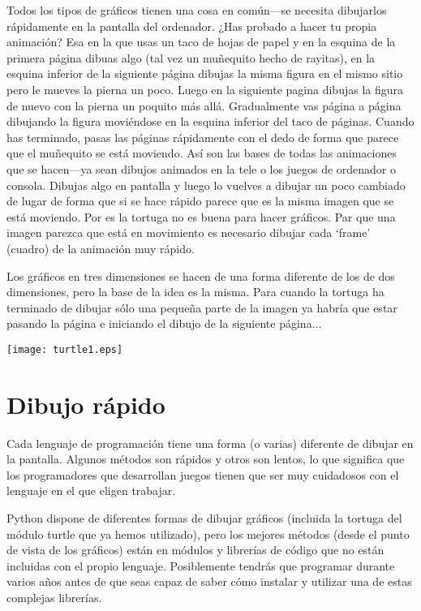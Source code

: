 Todos los tipos de gráficos tienen una cosa en común---se necesita dibujarlos rápidamente en la pantalla del ordenador.  ¿Has probado a hacer tu propia animación?  Esa en la que usas un taco de hojas de papel y en la esquina de la primera página dibuas algo (tal vez un muñequito hecho de rayitas), en la esquina inferior de la siguiente página dibujas la misma figura en el mismo sitio pero le mueves la pierna un poco. Luego en la siguiente pagina dibujas la figura de nuevo con la pierna un poquito más allá. Gradualmente vas página a página dibujando la figura moviéndose en la esquina inferior del taco de páginas.  Cuando has terminado, pasas las páginas rápidamente con el dedo de forma que parece que el muñequito se está moviendo.  Así son las bases de todas las animaciones que se hacen---ya sean dibujos animados en la tele o los juegos de ordenador o consola.  Dibujas algo en pantalla y luego lo vuelves a dibujar un poco cambiado de lugar de forma que si se hace rápido parece que es la misma imagen que se está moviendo. Por es la tortuga no es buena para hacer gráficos.  Par que una imagen parezca que está en movimiento es necesario dibujar cada `frame' (cuadro) de la animación muy rápido. 
\par
Los gráficos en tres dimensiones se hacen de una forma diferente de los de dos dimensiones, pero la base de la idea es la misma.  Para cuando la tortuga ha terminado de dibujar sólo una pequeña parte de la imagen ya habría que estar pasando la página e iniciando el dibujo de la siguiente página$\ldots$

\begin{center}
\texttt{[image: turtle1.eps]}
\end{center}

\section{Dibujo rápido}

Cada lenguaje de programación tiene una forma (o varias) diferente de dibujar en la pantalla. Algunos métodos son rápidos y otros son lentos, lo que significa que los programadores que desarrollan juegos tienen que ser muy cuidadosos con el lenguaje en el que eligen trabajar.
\par
Python dispone de diferentes formas de dibujar gráficos (incluida la tortuga del módulo turtle que ya hemos utilizado), pero los mejores métodos (desde el punto de vista de los gráficos) están en módulos y librerías de código que no están incluidas con el propio lenguaje.  Posiblemente tendrás que programar durante varios años antes de que seas capaz de saber cómo instalar y utilizar una de estas complejas librerías.

